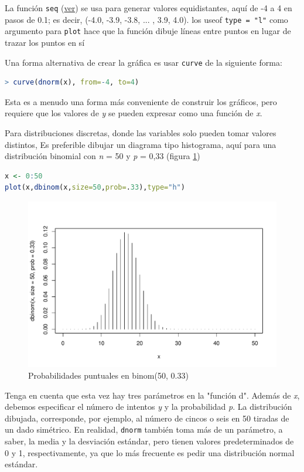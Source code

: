 La función \texttt{seq} (\hyperlink{seq}{ver}) se usa para generar valores equidistantes,
aquí de -4 a 4 en pasos de 0.1; es decir, (-4.0, -3.9, -3.8, ... , 3.9, 4.0). los
useof \texttt{type = "l"} como argumento para \texttt{plot} hace que la función
dibuje líneas entre puntos en lugar de trazar los puntos en sí

Una forma alternativa de crear la gráfica es usar \texttt{curve} de la
siguiente forma:

\begin{lstlisting}[language=R]
> curve(dnorm(x), from=-4, to=4)
\end{lstlisting}

Esta es a menudo una forma más conveniente de construir los gráficos, pero
requiere que los valores de \textit{y} se pueden expresar como una función de
\textit{x}.

Para distribuciones discretas, donde las variables solo pueden tomar valores
distintos, Es preferible dibujar un diagrama tipo histograma, aquí para una
distribución binomial con \textit{n} = 50 y \textit{p} = 0,33 (figura
\ref{fig-8})

\begin{lstlisting}[language=R]
x <- 0:50
plot(x,dbinom(x,size=50,prob=.33),type="h")
\end{lstlisting}

\begin{figure}[H]
    \includegraphics[width=\linewidth]{img/fig-8.pdf}
    \caption{Probabilidades puntuales en binom(50, 0.33)}
    \label{fig-8}
\end{figure}

Tenga en cuenta que esta vez hay tres parámetros en la "función d". Además de
\textit{x}, debemos especificar el número de intentos \textit{y} y la
probabilidad \textit{p}. La distribución dibujada, corresponde, por ejemplo, al
número de cincos o seis en 50 tiradas de un dado simétrico. En realidad,
\texttt{dnorm} también toma más de un parámetro, a saber, la media y la
desviación estándar, pero tienen valores predeterminados de 0 y 1,
respectivamente, ya que lo más frecuente es pedir una distribución normal
estándar.

